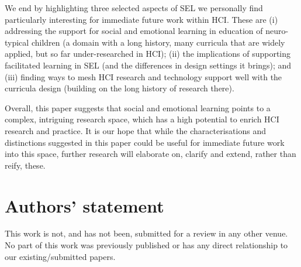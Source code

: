 \documentclass[prodmode,acmtochi]{acmsmall}
\newcommand{\todo}[1]{\textrm{\textrm{\textcolor{LightBlue}{[[#1]]} } } }
\begin{document}
We end by highlighting three selected aspects of SEL we personally find particularly interesting for immediate future work within HCI. These are (i) addressing the support for social and emotional learning in education of neuro-typical children (a domain with a long history, many curricula that are widely applied, but so far under-researched in HCI); (ii) the implications of supporting facilitated learning in SEL (and the differences in design settings it brings); and (iii) finding ways to mesh HCI research and technology support well with the curricula design (building on the long history of research there).
%


Overall, this paper suggests that social and emotional learning points to a complex, intriguing research space, which has a high potential to enrich HCI research and practice.
%
It is our hope that while the characterisations and distinctions suggested in this paper could be useful for immediate future work into this space, further research will elaborate on, clarify and extend, rather than reify, these.







\bigskip

\section*{Authors' statement}
This work is not, and has not been, submitted for a review in any other venue. No part of this work was previously published or has any direct relationship to our existing/submitted papers. 
\end{document}

